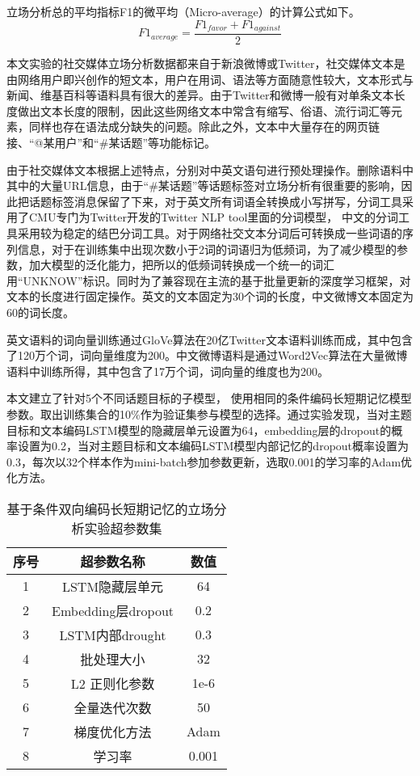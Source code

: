 立场分析总的平均指标F1的微平均（Micro-average）的计算公式如下。
\begin{equation}\label{f1average}F1_{average}=\frac{F1_{favor}+F1_{against}}{2}\end{equation}

本文实验的社交媒体立场分析数据都来自于新浪微博或Twitter，社交媒体文本是由网络用户即兴创作的短文本，用户在用词、语法等方面随意性较大，文本形式与新闻、维基百科等语料具有很大的差异。由于Twitter和微博一般有对单条文本长度做出文本长度的限制，因此这些网络文本中常含有缩写、俗语、流行词汇等元素，同样也存在语法成分缺失的问题。除此之外，文本中大量存在的网页链接、“@某用户”和“\#某话题”等功能标记。

由于社交媒体文本根据上述特点，分别对中英文语句进行预处理操作。删除语料中其中的大量URL信息，由于“\#某话题”等话题标签对立场分析有很重要的影响，因此把话题标签消息保留了下来，对于英文所有词语全转换成小写拼写，分词工具采用了CMU专门为Twitter开发的Twitter NLP tool里面的分词模型， 中文的分词工具采用较为稳定的结巴分词工具。对于网络社交文本分词后可转换成一些词语的序列信息，对于在训练集中出现次数小于2词的词语归为低频词，为了减少模型的参数，加大模型的泛化能力，把所以的低频词转换成一个统一的词汇用“UNKNOW”标识。同时为了兼容现在主流的基于批量更新的深度学习框架，对文本的长度进行固定操作。英文的文本固定为30个词的长度，中文微博文本固定为60的词长度。

英文语料的词向量训练通过GloVe算法在20亿Twitter文本语料训练而成，其中包含了120万个词，词向量维度为200。中文微博语料是通过Word2Vec算法在大量微博语料中训练所得，其中包含了17万个词，词向量的维度也为200。

本文建立了针对5个不同话题目标的子模型， 使用相同的条件编码长短期记忆模型参数。取出训练集合的10\%作为验证集参与模型的选择。通过实验发现，当对主题目标和文本编码LSTM模型的隐藏层单元设置为64，embedding层的dropout的概率设置为0.2，当对主题目标和文本编码LSTM模型内部记忆的dropout概率设置为0.3，每次以32个样本作为mini-batch参加参数更新，选取0.001的学习率的Adam优化方法。

\begin{table}[htbp]
	\caption[param]{基于条件双向编码长短期记忆的立场分析实验超参数集}
	\label{param}
	\vspace{0.5em}\centering\wuhao
	\begin{tabular}{ccc}
		\toprule[1.5pt]
		序号& 超参数名称 &数值\\
		\midrule[1pt]
		1 &LSTM隐藏层单元& 64\\
		2 &Embedding层dropout& 0.2\\
		3 &LSTM内部drought& 0.3\\
		4 &批处理大小& 32\\
		5 &L2 正则化参数 &1e-6\\
		6 &全量迭代次数& 50\\
		7 &梯度优化方法& Adam\\
		8 &学习率& 0.001\\
		\bottomrule[1.5pt]
	\end{tabular}
\end{table}

